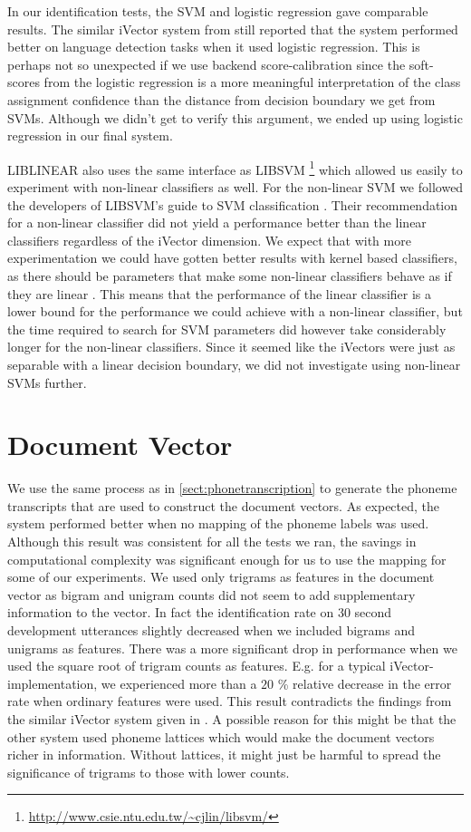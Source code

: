In our identification tests, the SVM and logistic regression gave comparable results. The similar iVector system from \cite{lrivector} still reported that the system performed better on language detection tasks when it used logistic regression. This is perhaps not so unexpected if we use backend score-calibration since the soft-scores from the logistic regression is a more meaningful interpretation of the class assignment confidence than the distance from decision boundary we get from SVMs. Although we didn't get to verify this argument, we ended up using logistic regression in our final system.

LIBLINEAR also uses the same interface as LIBSVM \footnote{\url{http://www.csie.ntu.edu.tw/~cjlin/libsvm/}} which allowed us easily to experiment with non-linear classifiers as well. For the non-linear SVM we followed the developers of LIBSVM's guide to SVM classification \cite{practicalsvm}. Their recommendation for a non-linear classifier did not yield a performance better than the linear classifiers regardless of the iVector dimension. We expect that with more experimentation we could have gotten better results with kernel based classifiers, as there should be parameters that make some non-linear classifiers behave as if they are linear \cite{keerthi2003asymptotic}. This means that the performance of the linear classifier is a lower bound for the performance we could achieve with a non-linear classifier, but the time required to search for SVM parameters did however take considerably longer for the non-linear classifiers. Since it seemed like the iVectors were just as separable with a linear decision boundary, we did not investigate using non-linear SVMs further. 

\section{Document Vector}
\label{sect:docvectlength}

We use the same process as in \ref{sect:phonetranscription} to generate the phoneme transcripts that are used to construct the document vectors. As expected, the system performed better when no mapping of the phoneme labels was used. Although this result was consistent for all the tests we ran, the savings in computational complexity was significant enough for us to use the mapping for some of our experiments. We used only trigrams as features in the document vector as bigram and unigram counts did not seem to add supplementary information to the vector. In fact the identification rate on 30 second development utterances slightly decreased when we included bigrams and unigrams as features. There was a more significant drop in performance when we used the square root of trigram counts as features. E.g. for a typical iVector-implementation, we experienced more than a $20$ \% relative decrease in the error rate when ordinary features were used. This result contradicts the findings from the similar iVector system given in \cite{lrivector}. A possible reason for this might be that the other system used phoneme lattices which would make the document vectors richer in information. Without lattices, it might just be harmful to spread the significance of trigrams to those with lower counts.

